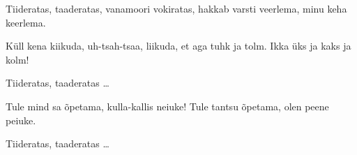 
Tiideratas, taaderatas, vanamoori vokiratas,
hakkab varsti veerlema, minu keha keerlema.

K\"ull kena kiikuda, uh-tsah-tsaa, liikuda,
et aga tuhk ja tolm. Ikka \"uks ja kaks ja kolm!

Tiideratas, taaderatas \ldots

Tule mind sa \~opetama, kulla-kallis neiuke!
Tule tantsu \~opetama, olen peene peiuke.

Tiideratas, taaderatas \ldots